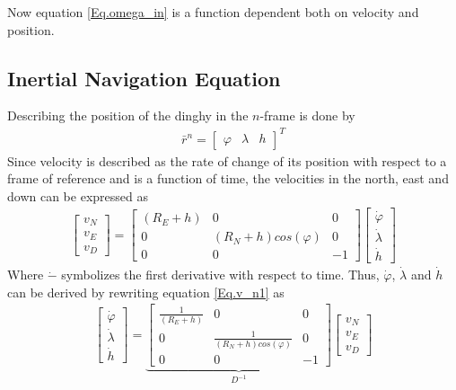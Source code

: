 \noindent Now equation \eqref{Eq.omega_in} is a function dependent both on velocity and position.

\subsection{Inertial Navigation Equation}
Describing the position of the dinghy in the $n$-frame is done by
\begin{align}
\bar{r}^n=
\begin{bmatrix}
\varphi & \lambda & h
\end{bmatrix}^T
\end{align}
Since velocity is described as the rate of change of its position with respect to a frame of reference and is a function of time, the velocities in the north, east and down can be expressed as\cite{nonlinear}
\begin{align}
\begin{bmatrix}
v_N \\
v_E \\
v_D
\end{bmatrix}
=
\begin{bmatrix}
(R_E+h) & 0 & 0 \\
0 & (R_N+h)cos(\varphi) & 0\\
0 & 0 & -1
\end{bmatrix}
\begin{bmatrix}
\dot{\varphi}\\
\dot{\lambda}\\
\dot{h}
\end{bmatrix}
\label{Eq.v_n1}
\end{align}
Where $\dot{-}$ symbolizes the first derivative with respect to time. Thus, $\dot{\varphi}$, $\dot{\lambda}$ and $\dot{h}$ can be derived by rewriting equation \eqref{Eq.v_n1} as
\begin{align}
\begin{bmatrix}
\dot{\varphi}\\
\dot{\lambda}\\
\dot{h}
\end{bmatrix}
=
\underbrace{\begin{bmatrix}
\frac{1}{(R_E+h)} & 0 & 0 \\
0 & \frac{1}{(R_N+h)cos(\varphi)} & 0\\
0 & 0 & -1
\end{bmatrix}}_{D^{-1}}
\begin{bmatrix}
v_N \\
v_E \\
v_D
\end{bmatrix}
\label{Eq.v_n}
\end{align}
